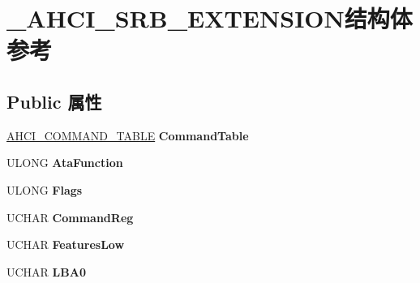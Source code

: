 \hypertarget{struct___a_h_c_i___s_r_b___e_x_t_e_n_s_i_o_n}{}\section{\+\_\+\+A\+H\+C\+I\+\_\+\+S\+R\+B\+\_\+\+E\+X\+T\+E\+N\+S\+I\+O\+N结构体 参考}
\label{struct___a_h_c_i___s_r_b___e_x_t_e_n_s_i_o_n}
\subsection*{Public 属性}
\begin{DoxyCompactItemize}
\item 
\mbox{\label{struct___a_h_c_i___s_r_b___e_x_t_e_n_s_i_o_n_acd4d1fbd14668c2c47c8fd5b10aaf656}} 
\hyperlink{struct___a_h_c_i___c_o_m_m_a_n_d___t_a_b_l_e}{A\+H\+C\+I\+\_\+\+C\+O\+M\+M\+A\+N\+D\+\_\+\+T\+A\+B\+LE} {\bfseries Command\+Table}
\item 
\mbox{\label{struct___a_h_c_i___s_r_b___e_x_t_e_n_s_i_o_n_a6369138097741365482c9b106b33b46d}} 
U\+L\+O\+NG {\bfseries Ata\+Function}
\item 
\mbox{\label{struct___a_h_c_i___s_r_b___e_x_t_e_n_s_i_o_n_ab8f4cc5a8ec1f6831d8005b49a6b371b}} 
U\+L\+O\+NG {\bfseries Flags}
\item 
\mbox{\label{struct___a_h_c_i___s_r_b___e_x_t_e_n_s_i_o_n_a6ba86bd2f95b8196d835dae0caaa6f62}} 
U\+C\+H\+AR {\bfseries Command\+Reg}
\item 
\mbox{\label{struct___a_h_c_i___s_r_b___e_x_t_e_n_s_i_o_n_af15079f321679d583c16c9fbcf9694e3}} 
U\+C\+H\+AR {\bfseries Features\+Low}
\item 
\mbox{\label{struct___a_h_c_i___s_r_b___e_x_t_e_n_s_i_o_n_a65af64e366b37ac93148149bd3befb0f}} 
U\+C\+H\+AR {\bfseries L\+B\+A0}
\item 
\mbox{\label{struct___a_h_c_i___s_r_b___e_x_t_e_n_s_i_o_n_a40f2760c396aea9f74add61f9549e482}} 

\end{DoxyCompactItemize}
